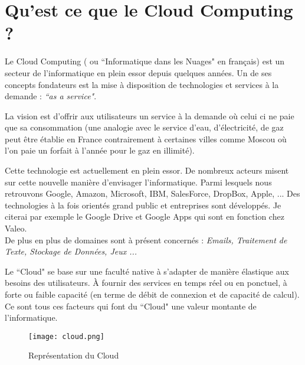 \section{Qu'est ce que le Cloud Computing ?}

Le Cloud Computing ( ou ``Informatique dans les Nuages" en français) est un secteur de l'informatique en plein essor depuis quelques années.
Un de ses concepts fondateurs est la mise à disposition de technologies et services à la demande : \textit{``as a service"}.

La vision est d'offrir aux utilisateurs un service à la demande où celui ci ne paie que sa consommation (une analogie avec le service  d'eau, d'électricité, de gaz peut être établie en France contrairement à certaines villes comme Moscou où l'on paie un forfait à l'année pour le gaz en illimité).

Cette technologie est actuellement en plein essor. De nombreux acteurs misent sur cette nouvelle manière d'envisager l'informatique. Parmi lesquels nous retrouvons Google, Amazon, Microsoft, IBM, SalesForce, DropBox, Apple, ... Des technologies à la fois orientés grand public et entreprises sont développés. Je citerai par exemple le Google Drive et Google Apps qui sont en fonction chez Valeo.\\
De plus en plus de domaines sont à présent concernés : \emph{Emails, Traitement de Texte, Stockage de Données, Jeux ...}

Le ``Cloud" se base sur une faculté native à s'adapter de manière élastique aux besoins des utilisateurs. À fournir des services en temps réel ou en ponctuel, à forte ou faible capacité (en terme de débit de connexion et de capacité de calcul). Ce sont tous ces facteurs qui font du ``Cloud" une valeur montante de l'informatique.

 \begin{figure}[H]
    \centering
    \texttt{[image: cloud.png]}
	\caption{Représentation du Cloud}\label{image.cloud} 
\end{figure}